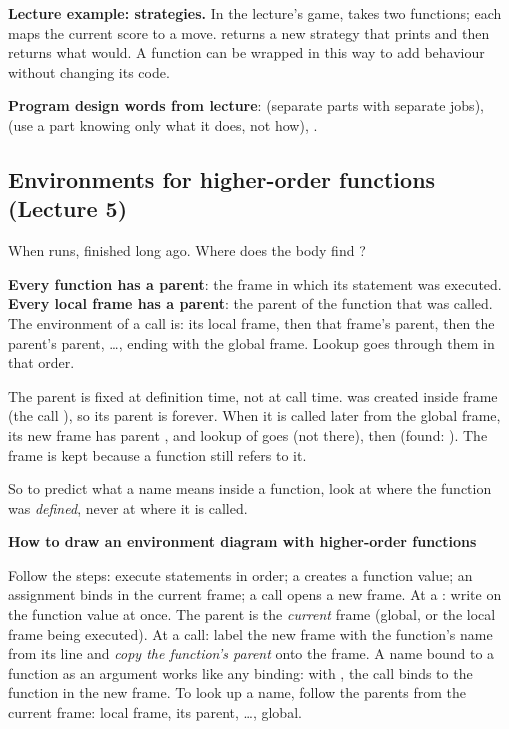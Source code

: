 \documentclass[10pt]{scrartcl}
\newenvironment{howto}[1]{\begin{mdframed}[style=howtostyle]{\color{NavyBlue}\textbf{#1}}\par\vspace{2pt}}{\end{mdframed}}
\begin{document}
\textbf{Lecture example: strategies.} In the lecture's game,  takes two functions; each maps the current score to a move.  returns a new strategy that prints  and then returns what  would. A function can be wrapped in this way to add behaviour without changing its code.

\textbf{Program design words from lecture}:  (separate parts with separate jobs),  (use a part knowing only what it does, not how), .

\subsection{Environments for higher-order functions (Lecture 5)}
\begin{qbox}
  When  runs,  finished long ago. Where does the body  find ?
\end{qbox}
\begin{itemize}
  \ii \textbf{Every function has a parent}: the frame in which its  statement was executed.
  \ii \textbf{Every local frame has a parent}: the parent of the function that was called.
  \ii The environment of a call is: its local frame, then that frame's parent, then the parent's parent, \dots, ending with the global frame. Lookup goes through them in that order.
\end{itemize}
\begin{ideabox}
The parent is fixed at definition time, not at call time.  was created inside frame  (the call ), so its parent is  forever. When it is called later from the global frame, its new frame  has parent , and lookup of  goes  (not there), then  (found: ). The frame  is kept because a function still refers to it.

So to predict what a name means inside a function, look at where the function was \emph{defined}, never at where it is called.
\end{ideabox}
\begin{howto}{How to draw an environment diagram with higher-order functions}
\begin{steps}
  \ii Follow the  steps: execute statements in order; a  creates a function value; an assignment binds in the current frame; a call opens a new frame.
  \ii At a : write \cd{[parent=...]} on the function value at once. The parent is the \emph{current} frame (global, or the local frame being executed).
  \ii At a call: label the new frame with the function's name from its  line and \emph{copy the function's parent} onto the frame.
  \ii A name bound to a function as an argument works like any binding: with , the call  binds  to the  function in the new frame.
  \ii To look up a name, follow the parents from the current frame: local frame, its parent, \dots, global.
\end{steps}
\end{howto}
\end{document}
